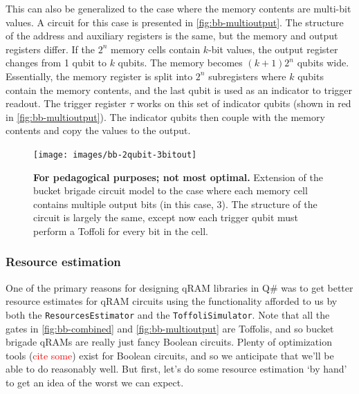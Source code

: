 \documentclass[a4paper,12pt]{article}
\newcommand\todo[1]{\textcolor{red}{#1}}
\begin{document}
This can also be generalized to the case where the memory contents are multi-bit values. 
A circuit for this case is presented in \autoref{fig:bb-multioutput}. 
The structure of the address and auxiliary registers is the same, but the memory and output registers differ. 
If the $2^n$ memory cells contain $k$-bit values, the output register changes from 1 qubit to $k$ qubits.
The memory becomes $(k+1)2^n$ qubits wide. 
Essentially, the memory register is split into $2^n$ subregisters where $k$ qubits contain the memory contents, and the last qubit is used as an indicator to trigger readout. 
The trigger register $\tau$ works on this set of indicator qubits (shown in red in \autoref{fig:bb-multioutput}). 
The indicator qubits then couple with the memory contents and copy the values to the output.

\begin{figure}
 \centering
 \captionsetup{width=.89\linewidth}
 \texttt{[image: images/bb-2qubit-3bitout]}
 \caption{\textbf{For pedagogical purposes; not most optimal.} 
 Extension of the bucket brigade circuit model to the case where each memory cell contains multiple output bits (in this case, 3). 
 The structure of the circuit is largely the same, except now each trigger qubit must perform a Toffoli for every bit in the cell.}
 \label{fig:bb-multioutput}
\end{figure}


\subsubsection{Resource estimation}

One of the primary reasons for designing qRAM libraries in Q\# was to get better resource estimates for qRAM circuits using the functionality afforded to us by both the \texttt{ResourcesEstimator} and the \texttt{ToffoliSimulator}.
Note that all the gates in \autoref{fig:bb-combined} and \autoref{fig:bb-multioutput} are Toffolis, and so bucket brigade qRAMs are really just fancy Boolean circuits. 
Plenty of optimization tools (\todo{cite some}) exist for Boolean circuits, and so we anticipate that we'll be able to do reasonably well. 
But first, let's do some resource estimation `by hand' to get an idea of the worst we can expect.
\end{document}
